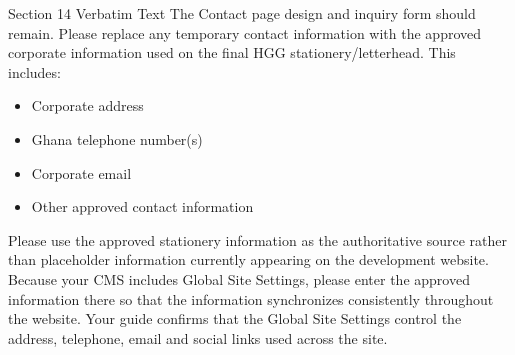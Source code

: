 \documentclass[11pt,a4paper]{article}
\begin{document}
\begin{VerbatimClientBox}{Section 14 Verbatim Text}
The Contact page design and inquiry form should remain.
Please replace any temporary contact information with the approved corporate information used on the final HGG stationery/letterhead.
This includes:
\begin{itemize}[noitemsep]
    \item Corporate address
    \item Ghana telephone number(s)
    \item Corporate email
    \item Other approved contact information
\end{itemize}
Please use the approved stationery information as the authoritative source rather than placeholder information currently appearing on the development website.
Because your CMS includes Global Site Settings, please enter the approved information there so that the information synchronizes consistently throughout the website. Your guide confirms that the Global Site Settings control the address, telephone, email and social links used across the site.
\end{VerbatimClientBox}
\end{document}
